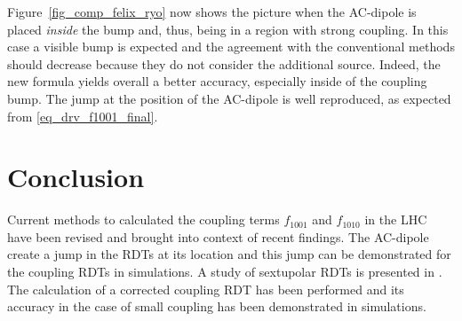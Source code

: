 Figure~\ref{fig_comp_felix_ryo} now shows the picture when the AC-dipole is placed \emph{inside} the bump and,
thus, being in a region with strong coupling. In this case a visible bump is expected and the agreement with the
conventional methods should decrease because they do not consider the additional source.
Indeed, the new formula yields overall a better accuracy, especially inside of the coupling bump.
The jump at the position of the AC-dipole is well reproduced, as expected from \eqref{eq_drv_f1001_final}.

\section{Conclusion}

Current methods to calculated the coupling terms $f_{1001}$ and $f_{1010}$ in the LHC have been revised and
brought into context of recent findings. The AC-dipole create a jump in the RDTs at its location and this jump
can be demonstrated for the coupling RDTs in simulations. A study of sextupolar RDTs is presented in \cite{Carlier2020}.
The calculation of a corrected coupling RDT has been performed and its accuracy in the case of small coupling
has been demonstrated in simulations.